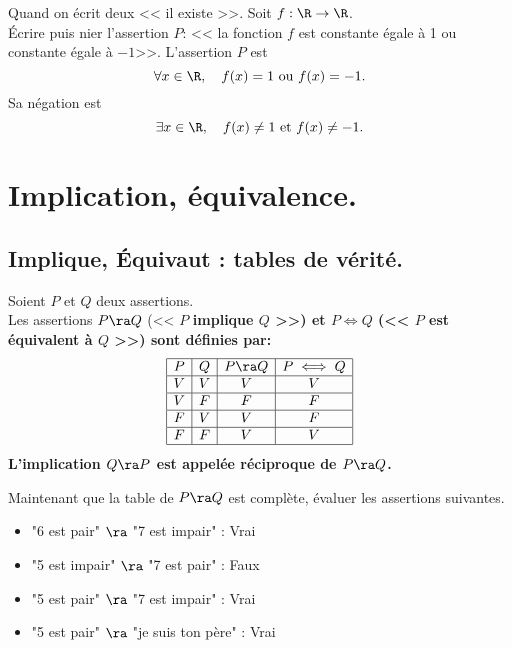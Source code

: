 \documentclass[11pt]{article}
\begin{document}
\begin{ex}{Quand on écrit deux << il existe >>.}{}
    Soit $f:\R\to\R$.\\
    Écrire puis nier l'assertion $P$: << la fonction $f$ est constante égale à 1 ou constante égale à $-1$>>.
    \tcblower
    L'assertion $P$ est
    \begin{equation*}
        \forall x\in\R,\quad f(x)=1\text{ ou }f(x)=-1.
    \end{equation*}
    Sa négation est
    \begin{equation*}
        \exists x\in\R,\quad f(x)\neq 1\text{ et }f(x)\neq -1.
    \end{equation*}
\end{ex}

\section{Implication, équivalence.}

\subsection{Implique, Équivaut : tables de vérité.}

\begin{defi}{}{}
    Soient $P$ et $Q$ deux assertions.\\
    Les assertions $P\ra Q$ (<< $P$ \bf{implique} $Q$ >>) et $P\iff Q$ (<< $P$ est \bf{équivalent} à $Q$ >>) sont définies par:
    \begin{equation*}
        \begin{array}{|c|c|c|c|c|}
            \hline
            P&Q&P\ra Q&P\iff Q\\
            \hline
            V&V&V&V\\
            \hline
            V&F&F&F\\
            \hline
            F&V&V&F\\
            \hline
            F&F&V&V\\
            \hline
        \end{array}
    \end{equation*}
    L'implication $Q\ra P$ est appelée \bf{réciproque} de $P\ra Q$.
\end{defi}

\begin{ex}{}{}
    Maintenant que la table de $P\ra Q$ est complète, évaluer les assertions suivantes.
    \begin{itemize}[topsep=0pt,itemsep=-0.9 ex]
        \item "6 est pair" $\ra$ "7 est impair" : Vrai
        \item "5 est impair" $\ra$ "7 est pair" : Faux
        \item "5 est pair" $\ra$ "7 est impair" : Vrai
        \item "5 est pair" $\ra$ "je suis ton père" : Vrai 
    \end{itemize}
\end{ex}
\end{document}
